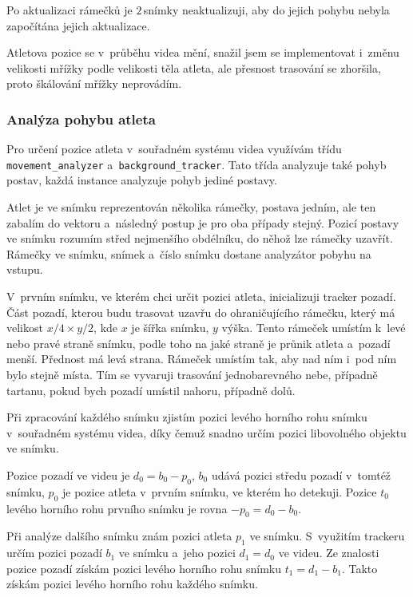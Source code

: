 Po aktualizaci rámečků je $2$\,\rm snímky neaktualizuji, aby do jejich pohybu nebyla započítána jejich aktualizace.

Atletova pozice se v~průběhu videa mění, snažil jsem se implementovat i~změnu velikosti mřížky podle velikosti těla atleta, ale přesnost trasování se zhoršila, proto škálování mřížky neprovádím.


\subsubsection{Analýza pohybu atleta}

Pro určení pozice atleta v~souřadném systému videa využívám třídu \texttt{movement\_analyzer} a~\texttt{background\_tracker}. Tato třída analyzuje také pohyb postav, každá instance analyzuje pohyb jediné postavy.

Atlet je ve snímku reprezentován několika rámečky, postava jedním, ale ten zabalím do vektoru a~následný postup je pro oba případy stejný. Pozicí postavy ve snímku rozumím střed nejmenšího obdélníku, do něhož lze rámečky uzavřít. Rámečky ve snímku, snímek a~číslo snímku dostane analyzátor pobyhu na vstupu.

V~prvním snímku, ve kterém chci určit pozici atleta, inicializuji tracker pozadí. Část pozadí, kterou budu trasovat uzavřu do ohraničujícího rámečku, který má velikost $x/4\times y/2$, kde $x$ je šířka snímku, $y$ výška. Tento rámeček umístím k~levé nebo pravé straně snímku, podle toho na jaké straně je průnik atleta a~pozadí menší. Přednost má levá strana. Rámeček umístím tak, aby nad ním i~pod ním bylo stejně místa. Tím se vyvaruji trasování jednobarevného nebe, případně tartanu, pokud bych pozadí umístil nahoru, případně dolů.

Při zpracování každého snímku zjistím pozici levého horního rohu snímku v~souřadném systému videa, díky čemuž snadno určím pozici libovolného objektu ve snímku.

Pozice pozadí ve videu je $d_0=b_0-p_0$, $b_0$ udává pozici středu pozadí v~tomtéž snímku, $p_0$ je pozice atleta v~prvním snímku, ve kterém ho detekuji. Pozice $t_0$ levého horního rohu prvního snímku je rovna $-p_0=d_0-b_0$.

Při analýze dalšího snímku znám pozici atleta $p_1$ ve snímku. S~využitím trackeru určím pozici pozadí $b_1$ ve snímku a~jeho pozici $d_1=d_0$ ve videu. Ze znalosti pozice pozadí získám pozici levého horního rohu snímku $t_1=d_1-b_1$. Takto získám pozici levého horního rohu každého snímku.


